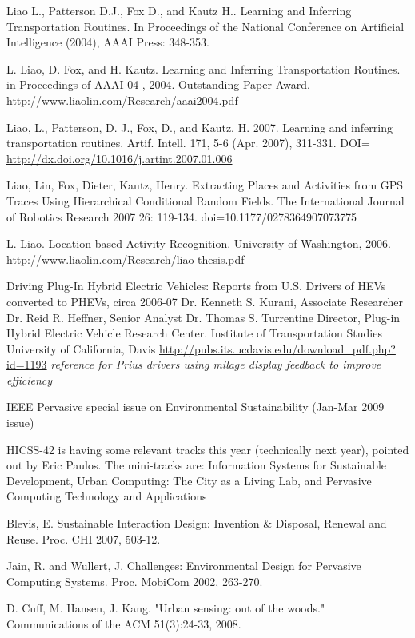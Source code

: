 Liao L., Patterson D.J., Fox D., and Kautz H.. Learning and Inferring Transportation Routines. In Proceedings of the National Conference on Artificial Intelligence (2004), AAAI Press: 348-353.

L. Liao, D. Fox, and H. Kautz. Learning and Inferring Transportation Routines. in Proceedings of AAAI-04 , 2004. Outstanding Paper Award. \url{http://www.liaolin.com/Research/aaai2004.pdf}

Liao, L., Patterson, D. J., Fox, D., and Kautz, H. 2007. Learning and inferring transportation routines. Artif. Intell. 171, 5-6 (Apr. 2007), 311-331. DOI= \url{http://dx.doi.org/10.1016/j.artint.2007.01.006}

Liao, Lin, Fox, Dieter, Kautz, Henry. Extracting Places and Activities from GPS Traces Using Hierarchical Conditional Random Fields. The International Journal of Robotics Research 2007 26: 119-134. doi=10.1177/0278364907073775

L. Liao. Location-based Activity Recognition. University of Washington, 2006. \url{http://www.liaolin.com/Research/liao-thesis.pdf}

Driving Plug-In Hybrid Electric Vehicles: Reports from U.S. Drivers of HEVs  
converted to PHEVs, circa 2006-07 Dr. Kenneth S. Kurani, Associate Researcher 
Dr. Reid R. Heffner, Senior Analyst Dr. Thomas S. Turrentine Director, Plug-in Hybrid Electric Vehicle Research Center. Institute of Transportation Studies 
University of California, Davis \url{http://pubs.its.ucdavis.edu/download_pdf.php?id=1193} \emph{reference for Prius drivers using milage display feedback to improve efficiency}

IEEE Pervasive special issue on Environmental Sustainability (Jan-Mar 2009 issue)

HICSS-42 is having some relevant tracks this year (technically next year), pointed out by Eric Paulos. The mini-tracks are: Information Systems for Sustainable Development, Urban Computing: The City as a Living Lab, and Pervasive Computing Technology and Applications

Blevis, E.  Sustainable Interaction Design: Invention \& Disposal, Renewal and Reuse.  Proc. CHI 2007, 503-12.

Jain, R. and Wullert, J. Challenges: Environmental Design for Pervasive Computing Systems.  Proc. MobiCom 2002, 263-270.

D. Cuff, M. Hansen, J. Kang. "Urban sensing: out of the woods." Communications of the ACM 51(3):24-33, 2008.




